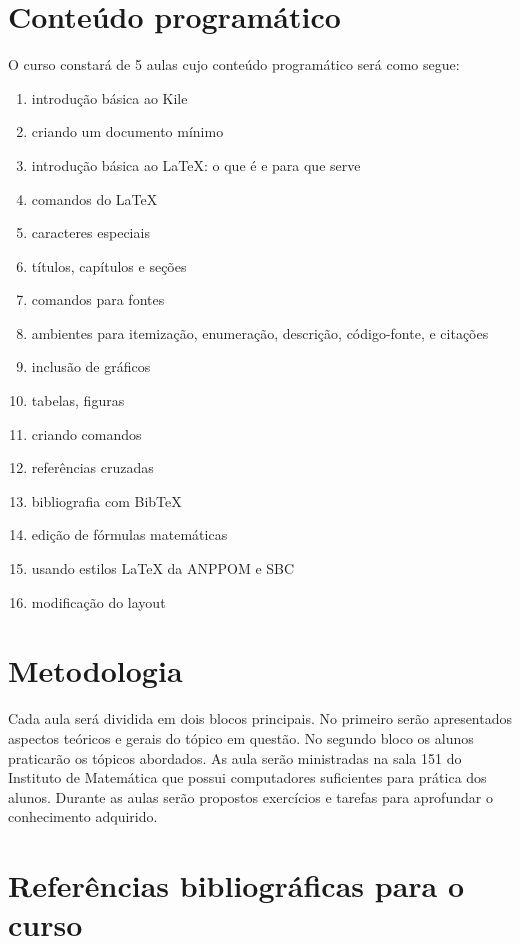 \documentclass[12pt,brazil]{article}
\begin{document}
\section{Conteúdo programático} 

O curso constará de 5 aulas cujo conteúdo programático será como
segue:

\begin{enumerate}
\item introdução básica ao Kile
\item criando um documento mínimo
\item introdução básica ao LaTeX: o que é e para que serve
\item comandos do LaTeX
\item caracteres especiais
\item títulos, capítulos e seções
\item comandos para fontes
\item ambientes para itemização, enumeração, descrição, código-fonte, e citações
\item inclusão de gráficos
\item tabelas, figuras
\item criando comandos
\item referências cruzadas
\item bibliografia com BibTeX
\item edição de fórmulas matemáticas
\item usando estilos LaTeX da ANPPOM e SBC
\item modificação do layout
\end{enumerate} 

\section{Metodologia}

Cada aula será dividida em dois blocos principais. No primeiro serão
apresentados aspectos teóricos e gerais do tópico em questão. No
segundo bloco os alunos praticarão os tópicos abordados. As aula serão
ministradas na sala 151 do Instituto de Matemática que possui
computadores suficientes para prática dos alunos. Durante as aulas
serão propostos exercícios e tarefas para aprofundar o conhecimento
adquirido.

\section{Referências bibliográficas para o curso}
\end{document}
